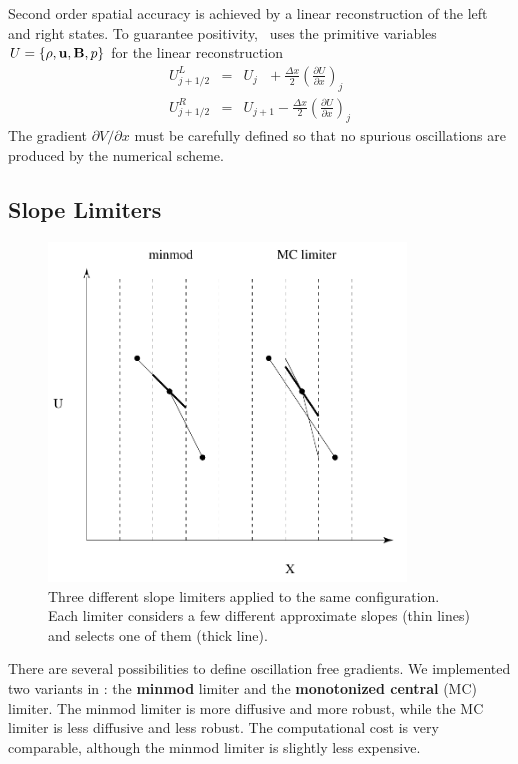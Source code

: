 Second order spatial accuracy is achieved by a linear reconstruction
of the left and right states. To guarantee positivity, 
\BATSRUS\ uses the primitive variables $U=\{\rho,\mathbf{u},\mathbf{B},p\}$ 
for the linear reconstruction
\begin{eqnarray}
  U_{j+1/2}^L&=&U_{j}\ \ \ 
  + \frac{\Delta x}{2}\left(\frac{\partial U}{\partial x}\right)_j 
\nonumber\\
   U_{j+1/2}^R&=&U_{j+1} 
  - \frac{\Delta x}{2}\left(\frac{\partial U}{\partial x}\right)_j 
\label{q-LR-second-order}
\end{eqnarray}
The gradient $\partial V/\partial x$ must be carefully defined so that
no spurious oscillations are produced by the numerical scheme. 

\subsection{Slope Limiters \label{section:limiters}}

\begin{figure}
   \begin{center}
   \includegraphics[height=9cm]{slope.pdf}
   \end{center}
   \caption{Three different slope limiters applied to the same
            configuration. Each limiter considers a few different 
            approximate slopes (thin lines) and selects one of them
            (thick line).
           }
\label{fig:limiter}
\end{figure}

There are several possibilities to define oscillation free gradients. 
We implemented two variants in \BATSRUS: the {\bf minmod} limiter
and the {\bf monotonized central} (MC) limiter. The minmod limiter
is more diffusive and more robust, while the MC limiter is less diffusive
and less robust. The computational cost is very comparable, although the
minmod limiter is slightly less expensive.

